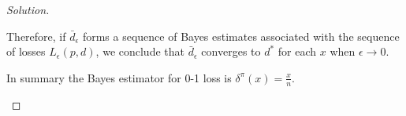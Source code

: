 \begin{proof}[Solution]
\begin{enumerate}
        Therefore, if $\bar{d}_{\epsilon}$ forms a sequence of Bayes
        estimates associated with the sequence of losses $L_{\epsilon}(p,d)$, we conclude that $\bar{d}_{\epsilon}$ converges to $d^*$
        for each $x$ when $\epsilon \to 0$. 

        In summary the Bayes estimator for 0-1 loss is $\delta^{\pi}(x) = \frac{x}{n}$. 
    \end{enumerate}
\end{proof}